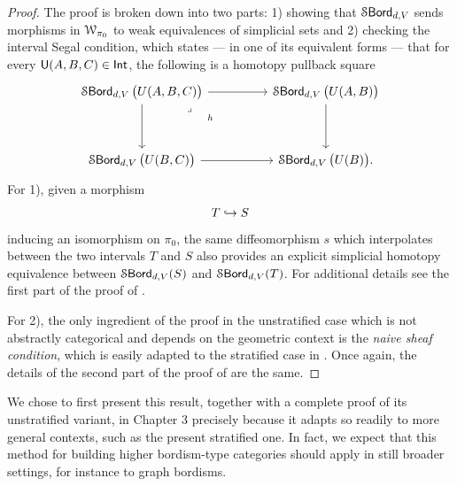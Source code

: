 \begin{proof}
    The proof is broken down into two parts: 1) showing that $\operatorname{\mathcal S\mathsf{Bord}}_{d,V}$ sends morphisms in $\mathcal W_{\pi_{0}}$ to weak equivalences of simplicial sets and 2) checking the interval Segal condition, which states — in one of its equivalent forms — that for every $\mathsf U(A,B,C)\in \operatorname{\mathsf{Int}}$, the following is a homotopy pullback square
     \begin{equation}\label{ch5:: eq: Segal condition for bordism}
        \begin{tikzcd}[ampersand replacement=\&]
            {\bordstr_{d,V}\big(U(A,B,C)\big)} \&\& {\bordstr_{d,V}\big(U(A,B)\big)} \\
            \\
            {\bordstr_{d,V}\big(U(B,C)\big)} \&\& {\bordstr_{d,V}\big(U(B)\big).}
            \arrow[from=1-1, to=1-3]
            \arrow[from=1-1, to=3-1]
            \arrow["h"{description, pos=0.3}, "\lrcorner"{anchor=center, pos=0.125}, draw=none, from=1-1, to=3-3]
            \arrow[from=1-3, to=3-3]
            \arrow[from=3-1, to=3-3]
        \end{tikzcd}
    \end{equation} 
    For 1), given a morphism 
    \begin{equation}
        T \hookrightarrow S
    \end{equation}
    inducing an isomorphism on $\pi_0$, the same diffeomorphism $s$ which interpolates between the two intervals $T$ and $S$ also provides an explicit simplicial homotopy equivalence between $\operatorname{\mathcal S\mathsf{Bord}}_{d,V}(S)$ and $\operatorname{\mathcal S\mathsf{Bord}}_{d,V}(T)$. For additional details see the first part of the proof of .

    For 2), the only ingredient of the proof in the unstratified case which is not abstractly categorical and depends on the geometric context is the \emph{naive sheaf condition}, which is easily adapted to the stratified case in . Once again, the details of the second part of the proof of  are the same.
\end{proof}

\begin{observation}
    We chose to first present this result, together with a complete proof of its unstratified variant, in Chapter 3 precisely because it adapts so readily to more general contexts, such as the present stratified one. In fact, we expect that this method for building higher bordism-type categories should apply in still broader settings, for instance to graph bordisms.
\end{observation}

